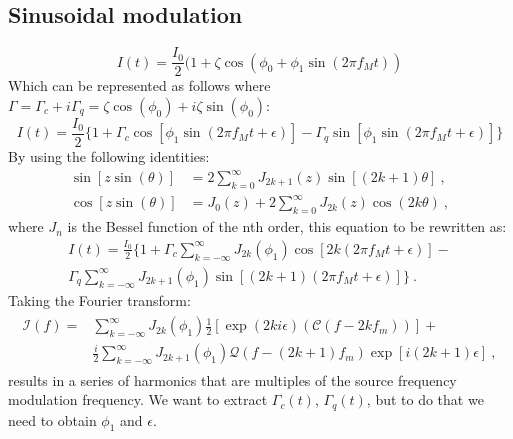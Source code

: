 \subsection{Sinusoidal modulation}
\begin{equation}
\label{eqn:probe_output1}
I(t) = \frac{I_0}{2} (1 + \zeta \cos(\phi_0 + \phi_1 \sin(2 \pi f_M t))
\end{equation}
Which can be represented as follows where $\Gamma=\Gamma_c+i \Gamma_q=\zeta\cos(\phi_0)+i\zeta\sin(\phi_0)$:
\begin{equation}
\label{eqn:probe_output2}
I(t) = \frac{I_0}{2} \{1 + \Gamma_c \cos[\phi_1 \sin(2 \pi f_M t + \epsilon)] - \Gamma_q \sin[\phi_1 \sin(2 \pi f_M t + \epsilon)]\}
\end{equation}
By using the following identities:
\begin{align}
\label{eqn:probe_output3}
\sin [z \sin (\theta)] &= 2 \sum_{k=0}^{\infty} J_{2k +1} (z) \sin [(2k+1) \theta]~, \\
\cos [z \sin (\theta)] &= J_0 (z) + 2 \sum_{k=0}^{\infty} J_{2k} (z) \cos (2k \theta)~,
\end{align}
where $J_n$ is the Bessel function of the nth order, this equation to be rewritten as:
\begin{equation}
\label{eqn:probe_output4}
\begin{split}
I(t) = \frac{I_0}{2} \{1 + \Gamma_c \sum_{k=-\infty}^{\infty} J_{2k} (\phi_1) \cos [2k (2 \pi f_M t + \epsilon)] - \\
\Gamma_q \sum_{k=-\infty}^{\infty} J_{2k +1} (\phi_1) \sin [(2k+1)(2 \pi f_M t + \epsilon)]\}~.
\end{split}
\end{equation}
Taking the Fourier transform:
\begin{align}
\begin{split}
\label{eqn:fourier_representation}
\mathcal{I} (f) = &\sum_{k=-\infty}^{\infty} J_{2k} (\phi_1) \frac{1}{2} [\exp (2k i \epsilon) (\mathcal{C}(f - 2 k f_m))] + \\
&\frac{i}{2} \sum_{k=-\infty}^{\infty} J_{2k+1} (\phi_1) \mathcal{Q}(f - (2k+1) f_m) \exp [i(2k +1 ) \epsilon]~,
\end{split}
\end{align}
results in a series of harmonics that are multiples of the source frequency modulation frequency. We want to extract $\Gamma_c (t)$, $\Gamma_q (t)$, but to do that we need to obtain $\phi_1$ and $\epsilon$.


